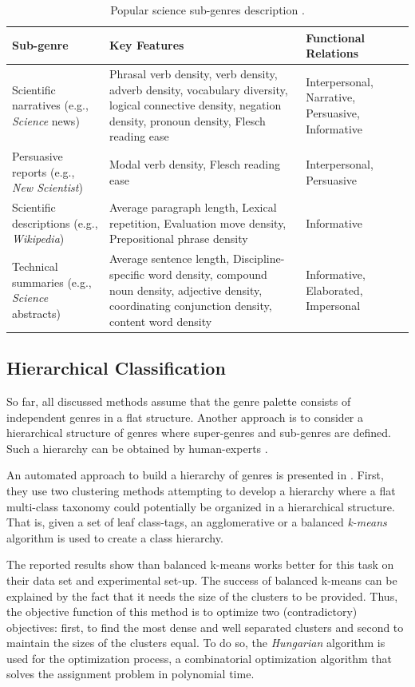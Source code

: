 \begin{table}[t]
	\center
	\caption {Popular science sub-genres description \parencite{lieungnapar2017genre}.}\label{chap:relevant_work:tbl:pop_science_registers_features}
	\begin{tabular}{p{3.5cm}p{7cm}p{2cm}}
		\hline
		Sub-genre & Key Features & Functional Relations \\
		\hline
		 Scientific narratives (e.g., \textit{Science} news) & Phrasal verb density, verb density, adverb density, vocabulary diversity, logical connective density, negation density, pronoun density, Flesch reading ease & Interpersonal, Narrative, Persuasive, Informative \\
         Persuasive reports (e.g., \textit{New Scientist}) & Modal verb density, Flesch reading ease & Interpersonal, Persuasive \\
         Scientific descriptions (e.g., \textit{Wikipedia}) & Average paragraph length, Lexical repetition, Evaluation move density, Prepositional phrase density & Informative\\
         Technical summaries (e.g., \textit{Science} abstracts)  & Average sentence length, Discipline-specific word density, compound noun density, adjective density, coordinating conjunction density, content word density & Informative, Elaborated, Impersonal  \\
  		\hline
	\end{tabular}
\end{table}

\subsection{Hierarchical Classification} 

So far, all discussed methods assume that the genre palette consists of independent genres in a flat structure. Another approach is to consider a hierarchical structure of genres where super-genres and sub-genres are defined. Such a hierarchy can be obtained by human-experts .

An automated approach to build a hierarchy of genres is presented in \parencite{madjarov2015web}. First, they use two clustering methods attempting to develop a hierarchy where a flat multi-class taxonomy could potentially be organized in a hierarchical structure. That is, given a set of  leaf class-tags, an agglomerative or a balanced \textit{k-means} algorithm is used to create a class hierarchy. 

The reported results show than balanced k-means works better for this task on their data set and experimental set-up. The success of balanced k-means can be explained by the fact that it needs the size of the clusters to be provided. Thus, the objective function of this method is to optimize two (contradictory) objectives: first, to find the most dense and well separated clusters and second to maintain the sizes of the clusters equal. To do so, the \textit{Hungarian} algorithm is used for the optimization process, a combinatorial optimization algorithm that solves the assignment problem in polynomial time.

